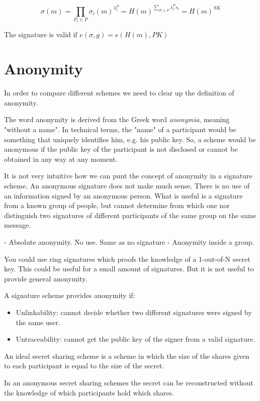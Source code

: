 $$ \sigma (m) = \prod_{P_i \in P} \sigma_i (m)^{\lambda_i^{P}}= H(m)^{\sum_{P_i \in P} \lambda_i^P s_i} = H(m)^{SK}$$

The signature is valid if $e(\sigma, g) = e(H(m), PK)$

\section{Anonymity}

In order to compare different schemes we need to clear up the definition of anonymity.

The word anonymity is derived from the Greek word \textit{anonymia}, meaning "without a name". In technical terms, the "name" of a participant would be something that uniquely identifies him, e.g. his public key. So, a scheme would be anonymous if the public key of the participant is not disclosed or cannot be obtained in any way at any moment.

It is not very intuitive how we can punt the concept of anonymity in a signature scheme. An anonymous signature does not make much sense. There is no use of an information signed by an anonymous person. What is useful is a signature from a known group of people, but cannot determine from which one nor distinguish two signatures of different participants of the same group on the same message.

- Absolute anonymity. No use. Same as no signature
- Anonymity inside a group. 



You could use ring signatures which proofs the knowledge of a 1-out-of-N secret key. This could be useful for a small amount of signatures. But it is not useful to provide general anonymity.

A signature scheme provides anonymity if:
\begin{itemize}
    \item Unlinkability: cannot decide whether two different signatures were signed by the same user.
    \item Untraceability: cannot get the public key of the signer from a valid signature.
\end{itemize}

\cite{BlSt97} 

An ideal secret sharing scheme is a scheme in which the size of the shares given to each participant is equal to the size of the secret.

In an anonymous secret sharing schemes the secret can be reconstructed without the knowledge of which participants hold which shares.